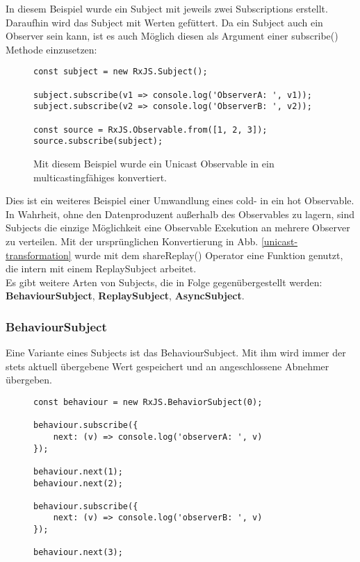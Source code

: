 \noindent
In diesem Beispiel wurde ein Subject mit jeweils zwei Subscriptions erstellt. Daraufhin wird das Subject mit Werten \glqq gefüttert\grqq. Da ein Subject auch ein Observer sein kann, ist es auch Möglich diesen als Argument einer subscribe() Methode einzusetzen:

\begin{figure}[H]
\begin{lstlisting}[basicstyle=\small]
const subject = new RxJS.Subject();

subject.subscribe(v1 => console.log('ObserverA: ', v1));
subject.subscribe(v2 => console.log('ObserverB: ', v2));

const source = RxJS.Observable.from([1, 2, 3]);
source.subscribe(subject);
\end{lstlisting}
\caption{Mit diesem Beispiel wurde ein Unicast Observable in ein multicastingfähiges konvertiert.}
\end{figure}


\noindent
Dies ist ein weiteres Beispiel einer Umwandlung eines cold- in ein hot Observable. In Wahrheit, ohne den Datenproduzent außerhalb des Observables zu lagern, sind Subjects die einzige Möglichkeit eine Observable Exekution an mehrere Observer zu verteilen. Mit der ursprünglichen Konvertierung in Abb. \ref{unicast-transformation} wurde mit dem shareReplay() Operator eine Funktion genutzt, die intern mit einem ReplaySubject arbeitet.\\

\noindent
Es gibt weitere Arten von Subjects, die in Folge gegenübergestellt werden: \textbf{BehaviourSubject}, \textbf{ReplaySubject}, \textbf{AsyncSubject}.

\subsubsection{BehaviourSubject}

Eine Variante eines Subjects ist das BehaviourSubject. Mit ihm wird immer der stets aktuell übergebene Wert gespeichert und an angeschlossene Abnehmer übergeben.

\begin{figure}[H]
\begin{lstlisting}[basicstyle=\small]
const behaviour = new RxJS.BehaviorSubject(0);

behaviour.subscribe({
    next: (v) => console.log('observerA: ', v)
});

behaviour.next(1);
behaviour.next(2);

behaviour.subscribe({
    next: (v) => console.log('observerB: ', v)
});

behaviour.next(3);
\end{lstlisting}
\end{figure}

